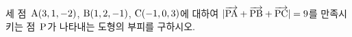 세 점~$\mathrm{A}(3{,}\mkern3mu\mathopen{}1{,}\mkern3mu\mathopen{}-2)$, $\mathrm{B}(1{,}\mkern3mu\mathopen{}2{,}\mkern3mu\mathopen{}-1)$, $\mathrm{C}(-1{,}\mkern3mu\mathopen{}0{,}\mkern3mu\mathopen{}3)$에 대하여 $|\overrightarrow{\mathrm{PA}}+\overrightarrow{\mathrm{PB}}+\overrightarrow{\mathrm{PC}}|=9$를 만족시키는 점~$\mathrm{P}$가 나타내는 도형의 부피를 구하시오.
